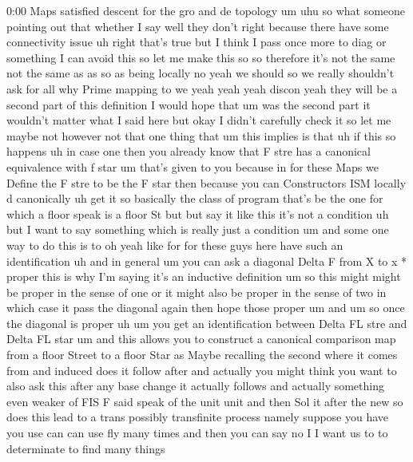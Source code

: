 \begin{unfinished}{0:00}
Maps  satisfied  descent  for  the  gro  and
de
topology  um  uhu  so  what  someone  pointing
out  that  whether  I  say  well  they  don't
right  because  there  have  some
connectivity
issue  uh  right  that's  true  but  I  think  I
pass  once  more  to  diag  or  something  I
can  avoid  this  so  let  me  make  this  so  so
therefore  it's  not  the  same  not  the  same
as  as  so  as  being  locally  no  yeah  we
should  so  we  really  shouldn't  ask  for
all  why  Prime  mapping  to
we  yeah  yeah
yeah  discon
yeah  they  will  be  a  second  part  of  this
definition  I  would  hope  that
um  was  the  second  part  it  wouldn't
matter  what  I  said  here  but  okay  I
didn't  carefully  check  it  so  let  me
maybe
not
however  not  that  one  thing  that
um  this
implies  is
that
uh  if  this  so
happens  uh  in  case  one  then  you  already
know  that  F  stre  has  a  canonical
equivalence  with  f  star  um  that's  given
to  you  because  in  for  these  Maps  we
Define  the  F  stre  to  be  the  F  star  then
because  you  can  Constructors  ISM
locally  d  canonically  uh  get
it  so  basically  the  class  of  program
that's  be  the  one  for  which  a  floor
speak  is  a  floor
St  but  but  say  it  like  this  it's  not  a
condition  uh  but  I  want  to  say  something
which  is  really  just  a  condition  um  and
some  one  way  to  do  this  is  to  oh  yeah
like  for  for  these  guys  here  have  such
an
identification  uh  and  in  general
um  you  can  ask  a
diagonal  Delta  F  from  X
to  x
*
proper  this  is  why  I'm  saying  it's  an
inductive  definition
um  so  this  might  might  be  proper  in  the
sense  of  one  or  it  might  also  be  proper
in  the  sense  of  two  in  which  case  it
pass  the  diagonal  again  then  hope  those
proper
um
and  um  so  once  the  diagonal  is  proper  uh
um  you  get  an  identification  between
Delta  FL  stre  and  Delta  FL
star  um  and  this  allows  you  to  construct
a  canonical  comparison  map  from  a  floor
Street  to  a  floor
Star  as  Maybe  recalling  the  second  where
it  comes  from  and
induced  does  it  follow  after  and
actually  you  might  think  you  want  to
also  ask  this  after  any  base  change  it
actually  follows  and  actually  something
even  weaker  of  FIS  F  said  speak  of  the
unit
unit  and  then  Sol  it  after  the
new  so  does  this  lead  to  a  trans
possibly
transfinite  process  namely  suppose  you
have  you  use  can  can  use  fly  many  times
and  then  you  can  say  no  I  I  want  us  to
to  determinate  to  find  many  things

\end{unfinished}

